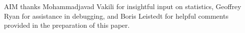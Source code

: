 \documentclass[iop]{emulateapj}
\begin{document}
%
%
%
%
%
%

\appendix{}

\begin{acknowledgements}
AIM thanks Mohammadjavad Vakili for insightful input on statistics, Geoffrey Ryan for assistance in debugging, and Boris Leistedt for helpful comments provided in the preparation of this paper.
\end{acknowledgements}

%
%
\end{document}
